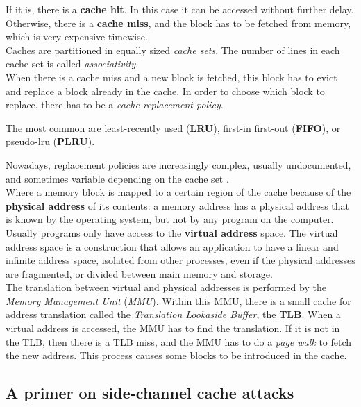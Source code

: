 \documentclass[11pt]{article}
\begin{document}
If it is, there is a \textbf{cache hit}. In this case it can be accessed without further delay. Otherwise, there is a \textbf{cache miss}, and the block has to be fetched from memory, which is very expensive timewise. \\

Caches are partitioned in equally sized \emph{cache sets}. The number of lines in each cache set is called \emph{associativity}.\\

When there is a cache miss and a new block is fetched, this block has to evict and replace a block already in the cache. In order to choose which block to replace, there has to be a \emph{cache replacement policy}.

The most common are least-recently used (\textbf{LRU}), first-in first-out (\textbf{FIFO}), or pseudo-lru (\textbf{PLRU}).

Nowadays, replacement policies are increasingly complex, usually undocumented, and sometimes variable depending on the cache set \cite{jaleel2010high, wong2015intel}.\\

Where a memory block is mapped to a certain region of the cache because of the \textbf{physical address} of its contents: a memory address has a physical address that is known by the operating system, but not by any program on the computer. Usually programs only have access to the \textbf{virtual address} space. The virtual address space is a construction that allows an application to have a linear and infinite address space, isolated from other processes, even if the physical addresses are fragmented, or divided between main memory and storage.\\

The translation between virtual and physical addresses is performed by the \emph{Memory Management Unit} (\emph{MMU}). Within this MMU, there is a small cache for address translation called the \emph{Translation Lookaside Buffer}, the \textbf{TLB}. When a virtual address is accessed, the MMU has to find the translation. If it is not in the TLB, then there is a TLB miss, and the MMU has to do a \emph{page walk} to fetch the new address. This process causes some blocks to be introduced in the cache.\\

\subsection{A primer on side-channel cache attacks}
\end{document}
